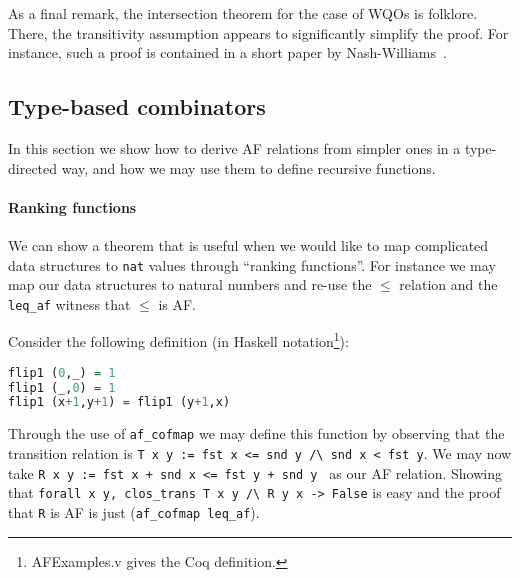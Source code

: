 \documentclass{llncs}
\begin{document}
As a final remark, the intersection theorem for the case of WQOs is folklore. There, 
the transitivity assumption appears to significantly simplify the 
proof. For instance, such a proof is contained in a short paper by Nash-Williams~\cite{OnWellQuasiOrderingFiniteTrees}.

\subsection{Type-based combinators}\label{ssect:typecomp}

In this section we show how to derive AF relations from simpler 
ones in a type-directed way, and how we may use them to define 
recursive functions. 

\paragraph{Ranking functions}
We can show a theorem that is useful when we would like to map 
complicated data structures to \lstinline|nat| values through ``ranking functions''.
For instance we may map our data structures to natural numbers and re-use the 
$\leq$ relation and the \lstinline|leq_af| witness that $\leq$ is AF.


\vspace{5pt}
\begin{example}
Consider the following definition (in Haskell notation\footnote{AFExamples.v 
gives the Coq definition.}):
\begin{lstlisting}[language=hs]
flip1 (0,_) = 1 
flip1 (_,0) = 1 
flip1 (x+1,y+1) = flip1 (y+1,x)
\end{lstlisting}
Through the use of \lstinline|af_cofmap| we may define this function by observing that
the transition relation is \lstinline|T x y := fst x <= snd y /\ snd x < fst y|. We may now
take \lstinline|R x y := fst x + snd x <= fst y + snd y | as our AF relation. Showing that 
\lstinline|forall x y, clos_trans T x y /\ R y x -> False|
is easy and the proof that \lstinline|R| is AF is just (\lstinline|af_cofmap leq_af|).
\end{example}
\end{document}

